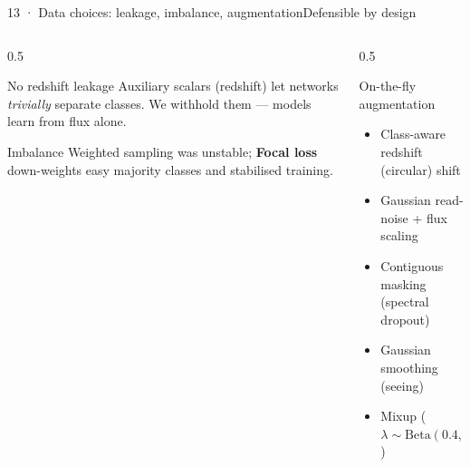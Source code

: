 \begin{frame}{13 · Data choices: leakage, imbalance, augmentation}{Defensible by design}
    \begin{columns}[T]
        \begin{column}{0.5\textwidth}
            \begin{alertblock}{No redshift leakage}
                Auxiliary scalars (redshift) let networks \emph{trivially} separate
                classes. We withhold them --- models learn from flux alone.
            \end{alertblock}
            \begin{block}{Imbalance}
                Weighted sampling was unstable; \textbf{Focal loss} down-weights easy
                majority classes and stabilised training.
            \end{block}
        \end{column}
        \begin{column}{0.5\textwidth}
            \begin{block}{On-the-fly augmentation}
                \footnotesize
                \begin{itemize}
                    \item Class-aware redshift (circular) shift
                    \item Gaussian read-noise + flux scaling
                    \item Contiguous masking (spectral dropout)
                    \item Gaussian smoothing (seeing)
                    \item Mixup ($\lambda\sim\text{Beta}(0.4,0.4)$)
                \end{itemize}
            \end{block}
        \end{column}
    \end{columns}
\end{frame}

